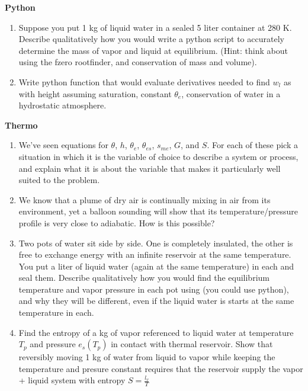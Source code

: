 \documentclass[12pt]{article}
\begin{document}
\textbf{Python}

\begin{enumerate}
\item[P1]  Suppose you put 1 kg of liquid water in a sealed 5 liter container 
at 280 K.  Describe qualitatively how you would write a python
script to  accurately determine the mass of vapor and liquid at
equilibrium.  (Hint:  think about using the fzero rootfinder, and
conservation of mass and volume).


\item[P2] Write python function that would evaluate derivatives needed to
find  $w_l$ as with height assuming saturation, constant $\theta_e$,
conservation of water in a hydrostatic atmosphere.


\end{enumerate}

\textbf{Thermo}

\begin{enumerate}
\item[T1]  We've seen equations for $\theta$, $h$, $\theta_e$, $\theta_{es}$, $s_{me}$, $G$,
and $S$.  For each of these pick a situation in which it is the variable of choice to
describe a system or process, and explain what it is about the variable that makes it
particularly well suited to the problem.


\item[T2]  We know that a plume of dry air is continually mixing in air from its environment,
yet a balloon sounding will show that its temperature/pressure profile is very close
to adiabatic.  How is this possible?

\item[T3]  Two pots of water sit side by side.  One is completely
insulated, the other is free to exchange energy with an
infinite reservoir at the same temperature.  You put a liter of liquid water (again at the same temperature) in each and
seal them.   Describe qualitatively how you would find the
equilibrium temperature and vapor pressure in each pot using
(you could use python), and why they will be different, even if
the liquid water is starts at the same temperature in each.


\item[T4] Find the entropy of a kg of vapor
referenced to liquid water  at temperature $T_p$ and pressure $e_s(T_p)$ in
contact with thermal reservoir.  Show that reversibly moving 1 kg
of water from liquid to vapor while keeping the temperature
and presure constant requires that the reservoir supply
the vapor + liquid system with entropy $S=\frac{ l_v}{T}$



\end{enumerate}
\end{document}
